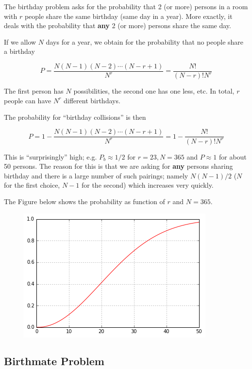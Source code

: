 
The birthday problem asks for the probability that 2 (or more) persons in a room with \(r\) people share the same birthday (same day in a year). More exactly, it deals with the probability that \textbf{any} 2 (or more) persons share the same day.

If we allow \(N\) days for a year, we obtain for the probability that no people share a birthday

\[
P = \frac{N(N-1)(N-2) \cdots (N-r+1)}{N^r} = \frac{N!}{(N-r)!N^r}
\]

The first person has \(N\) possibilities, the second one has one less, etc. In total, \(r\) people can have \(N^r\) different birthdays.

The probability for ``birthday collisions'' is then

\[
P = 1 - \frac{N(N-1)(N-2) \cdots (N-r+1)}{N^r} = 1 - \frac{N!}{(N-r)!N^r}
\]

This is ``surprisingly'' high; e.g. \(P_b \approx 1/2\) for \(r=23, N = 365\) and \(P \approx 1\) for about 50 persons. The reason for this is that we are asking for \textbf{any} persons sharing birthday and there is a large number of such pairings; namely \(N(N-1)/2\) (\(N\) for the first choice, \(N-1\) for the second) which increases very quickly.

The Figure below shows the probability as function of \(r\) and \(N=365\).

\begin{figure}[H]
\centering
\includegraphics{images/birthday_problem_2.png}
\end{figure}

\subsection{Birthmate Problem}

